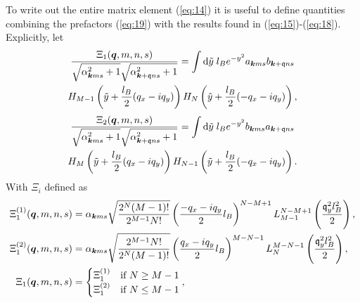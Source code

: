 To write out the entire matrix element (\ref{eq:14}) it is useful to define quantities combining the prefactors (\ref{eq:19}) with the results found in (\ref{eq:15})-(\ref{eq:18}).
Explicitly, let
\begin{multline}
  \label{eq:20}
  \frac{\Xi _1(\vec{q}, m, n, s)}{
    \sqrt{\alpha _{\vec{k} \vphantom{\qvec{q}} ms}^2 +1}
    \sqrt{\alpha _{\vec{k}+\qvec{q} ns}^2 + 1}
  }
  =
  \int \mathrm{d}\tilde{y} \; l_B e^{-y^2}
  a_{\vec{k}ms}b_{\vec{k} + \qvec{q} ns}\\
  H_{M-1} \left( \tilde{y} + \frac{l_B}{2}(q_x - iq_y) \right)
  H_N\left( \tilde{y} + \frac{l_B}{2}(-q_x - iq_y) \right)
  , 
\end{multline}
\begin{multline}
  \label{eq:21}
  \frac{\Xi _2 (\vec{q}, m, n, s)}{
    \sqrt{\alpha _{\vec{k} \vphantom{\qvec{q}} ms}^2 +1}
    \sqrt{\alpha _{\vec{k}+\qvec{q} ns}^2 + 1}
  }
  =
  \int \mathrm{d} \tilde{y} \; l_B e^{-y^2}
  b_{\vec{k}ms} a_{\vec{k} + \qvec{q} ns}\\
  H_M \left( \tilde{y} + \frac{l_B}{2}(q_x - iq_y) \right)
  H_{N-1} \left( \tilde{y} +  \frac{l_B}{2}(-q_x - iq_y)\right).
\end{multline}
With $\Xi_i$ defined as
\begin{align}
  \Xi_1 ^{(1)}(\bm{q}, m, n, s) &= \alpha _{\bm{k}ms} \sqrt{\frac{2^N (M-1)!}{2^{M-1} N!}}
                                   \left( \frac{-q_x - iq_y}{2} l_B \right)^{N-M + 1}
                                   L^{N-M+1}_{M-1} \left( \frac{\mathfrak{q}_y^2 l_B^2}{2} \right),\\
  \Xi_1 ^{(2)}(\bm{q}, m, n, s) &= \alpha _{\bm{k}ms} \sqrt{\frac{2^{M-1} N!}{2^N (M-1)!}}
                                   \left( \frac{q_x - iq_y}{2} l_B \right)^{M-N - 1}
                                   L^{M - N - 1}_N \left( \frac{\mathfrak{q}_y^2 l_B^2}{2} \right),\\
  \Xi_1(\bm{q}, m, n, s) &=
          \begin{cases}
            \Xi _1 ^{(1)} & \text{if } N \geq M-1\\
            \Xi _1 ^{(2)} & \text{if } N \leq M-1
          \end{cases}, \label{eq:22}
\end{align}
